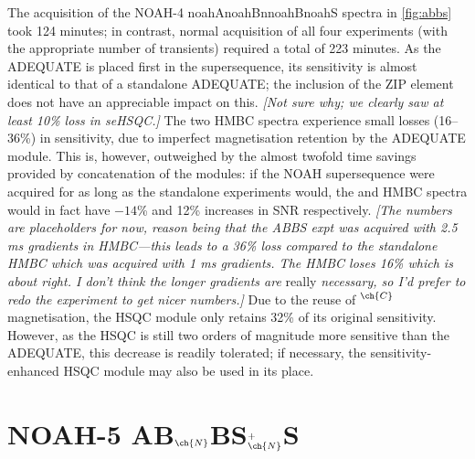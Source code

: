 \documentclass[a4paper,12pt]{article}
\newcommand{\carbon}{\ch{^{13}C}}
\newcommand{\nitrogen}{\ch{^{15}N}}
\newcommand{\magn}[1]{\ch{^1H}$^{#1}$}
\newcommand{\todo}[1]{{\color{OrangeRed}#1}}
\newcommand*{\noahfour}[4]{\csname noah#1\endcsname\csname noah#2\endcsname\csname noah#3\endcsname\csname noah#4\endcsname}
\begin{document}
\begin{refsection}
The acquisition of the NOAH-4 \noahfour{A}{Bn}{B}{S} spectra in \cref{fig:abbs} took 124 minutes; in contrast, normal acquisition of all four experiments (with the appropriate number of transients) required a total of 223 minutes.
As the ADEQUATE is placed first in the supersequence, its sensitivity is almost identical to that of a standalone ADEQUATE; the inclusion of the ZIP element does not have an appreciable impact on this. \todo{\textit{[Not sure why; we clearly saw at least 10\% loss in seHSQC.]}}
The two HMBC spectra experience small losses \todo{(16--36\%)} in sensitivity, due to imperfect magnetisation retention by the ADEQUATE module.
This is, however, outweighed by the almost twofold time savings provided by concatenation of the modules: if the NOAH supersequence were acquired for as long as the standalone experiments would, the \nitrogen{} and \carbon{} HMBC spectra would in fact have \todo{$-14$\%} and \todo{12\%} increases in SNR respectively.
\todo{\textit{
[The numbers are placeholders for now, reason being that the ABBS expt was acquired with 2.5 ms gradients in \nitrogen{} HMBC---this leads to a 36\% loss compared to the standalone \nitrogen{} HMBC which was acquired with 1 ms gradients.
The \carbon{} HMBC loses 16\% which is about right.
I don't think the longer gradients are} really \textit{necessary, so I'd prefer to redo the experiment to get nicer numbers.]
}}
Due to the reuse of \magn{\ch{C}} magnetisation, the HSQC module only retains 32\% of its original sensitivity.
However, as the HSQC is still two orders of magnitude more sensitive than the ADEQUATE, this decrease is readily tolerated; if necessary, the sensitivity-enhanced HSQC module\autocite{Palmer1991JMR,Kay1992JACS,Hansen2021AC,Yong2021JMR} may also be used in its place.

\section{NOAH-5 AB\texorpdfstring{$_{\ch{N}}$}{n}BS\texorpdfstring{$^+_{\ch{N}}$}{+n}S}


\end{refsection}
\end{document}
